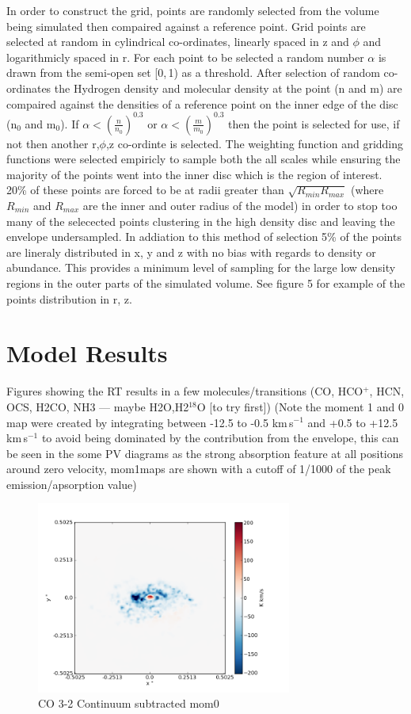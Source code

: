 \documentclass[useAMS,usenatbib]{mn2e}
\begin{document}
In order to construct the grid, points are randomly selected from the volume being simulated then compaired against a reference point. Grid points are selected at random in cylindrical co-ordinates, linearly spaced in z and $\phi$ and logarithmicly spaced in r. For each point to be selected a random number $\alpha$ is drawn from the semi-open set [0,$\,$1) as a threshold. After selection of random co-ordinates the Hydrogen density and molecular density at the point (n and m) are compaired against the densities of a reference point on the inner edge of the disc (n$_0$ and m$_0$). If $\alpha<\left( \frac{n}{n_0} \right)^{0.3}$ or $\alpha< \left( \frac{m}{m_0} \right)^{0.3}$ then the point is selected for use, if not then another r,$\phi$,z co-ordinte is selected. The weighting function and gridding functions were selected empiricly to sample both the all scales while ensuring the majority of the points went into the inner disc which is the region of interest. 20\% of these points are forced to be at radii greater than $\sqrt{R_{min}R_{max}}$ (where $R_{min}$ and $R_{max}$ are the inner and outer radius of the model) in order to stop too many of the selecected points clustering in the high density disc and leaving the envelope undersampled. In addiation to this method of selection 5\% of the points are lineraly distributed in x, y and z with no bias with regards to density or abundance. This provides a minimum level of sampling for the large low density regions in the outer parts of the simulated volume. See figure 5 for example of the points distribution in r, z.


\section{Model Results}

Figures showing the RT results in a few molecules/transitions (CO, HCO$^+$, HCN, OCS, H2CO, NH3 --- maybe H2O,H2$^{18}$O [to try first]) (Note the moment 1 and 0 map were created by integrating between -12.5 to -0.5 km$\,$s$^{-1}$ and +0.5 to +12.5 km$\,$s$^{-1}$ to avoid being dominated by the contribution from the envelope, this can be seen in the some PV diagrams as the strong absorption feature at all positions around zero velocity, mom1maps are shown with a cutoff of 1/1000 of the peak emission/apsorption value)
\begin{figure}
 \includegraphics[width=84mm]{Figures/sim/imageCO_3-2_30deg_contSub.png}

 \caption{CO 3-2 Continuum subtracted mom0}
\end{figure}
\end{document}
